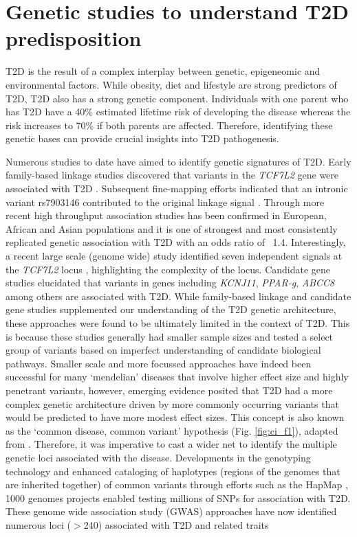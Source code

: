 \section{Genetic studies to understand T2D predisposition}
T2D is the result of a complex interplay between genetic, epigeneomic and environmental factors. While obesity, diet and lifestyle are strong predictors of T2D, T2D also has a strong genetic component. Individuals with one parent who has T2D have a 40\% estimated lifetime risk of developing the disease whereas the risk increases to 70\% if  both parents are affected. Therefore, identifying these genetic bases can provide crucial insights into T2D pathogenesis. 


Numerous studies to date have aimed to identify genetic signatures of T2D. Early family-based linkage studies discovered that variants in the \textit{TCF7L2} gene were associated with T2D \cite{duggiralaLinkageTypeDiabetes1999}. Subsequent fine-mapping efforts indicated that an intronic variant rs7903146 contributed to the original linkage signal  \cite{duggiralaLinkageTypeDiabetes1999, grantVariantTranscriptionFactor2006}. Through more recent high throughput association studies has been confirmed in European, African and Asian populations and it is one of strongest and most consistently replicated genetic association with T2D with an odds ratio of ~1.4. Interestingly, a recent large scale (genome wide) study identified seven independent signals at the \textit{TCF7L2} locus \cite{mahajanFinemappingTypeDiabetes2018}, highlighting the complexity of the locus. Candidate gene studies elucidated that variants in genes including \textit{KCNJ11}, \textit{PPAR-g}, \textit{ABCC8} among others are associated with T2D. While family-based linkage and candidate gene studies supplemented our understanding of the T2D genetic architecture, these approaches were found to be ultimately limited in the context of T2D. This is because these studies generally had smaller sample sizes and tested a select group of variants based on imperfect understanding of candidate biological pathways. Smaller scale and more focussed approaches have indeed been successful for many ‘mendelian’ diseases that involve higher effect size and highly penetrant variants, however, emerging evidence posited that T2D had a more complex genetic architecture driven by more commonly occurring variants that would be predicted to have more modest effect sizes. This concept is also known as the ‘common disease, common variant’ hypothesis (Fig. \ref{fig:ci_f1}), adapted from \cite{manolioFindingMissingHeritability2009}. Therefore, it was imperative to cast a wider net to identify the multiple genetic loci associated with the disease. Developments in the genotyping technology and enhanced cataloging of haplotypes (regions of the genomes that are inherited together) of common variants through efforts such as the HapMap \cite{theinteranationalhapmapconsortiumInternationalHapMapProject2003}, 1000 genomes \cite{the1000genomesprojectconsortiumGlobalReferenceHuman2015a} projects enabled testing millions of \ac{SNPs} for association with T2D. These genome wide association study (GWAS) approaches have now identified numerous loci ($>$240) associated with T2D and related traits 